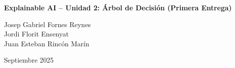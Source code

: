 \documentclass[11pt,a4paper]{article}
\begin{document}
\begin{titlepage}
  \thispagestyle{empty}
  \centering

  \vspace*{\fill} %

  {\Huge \textbf{Explainable AI – Unidad 2: Árbol de Decisión (Primera Entrega)}\par}
  \vspace{1cm}

  {\Large
  Josep Gabriel Fornes Reynes\\
  Jordi Florit Ensenyat\\
  Juan Esteban Rincón Marín\par}

  \vspace{1.2cm}

  {\large Septiembre 2025\par}

  \vspace*{\fill} %
\end{titlepage}

\clearpage









\printbibliography

% 
\end{document}
